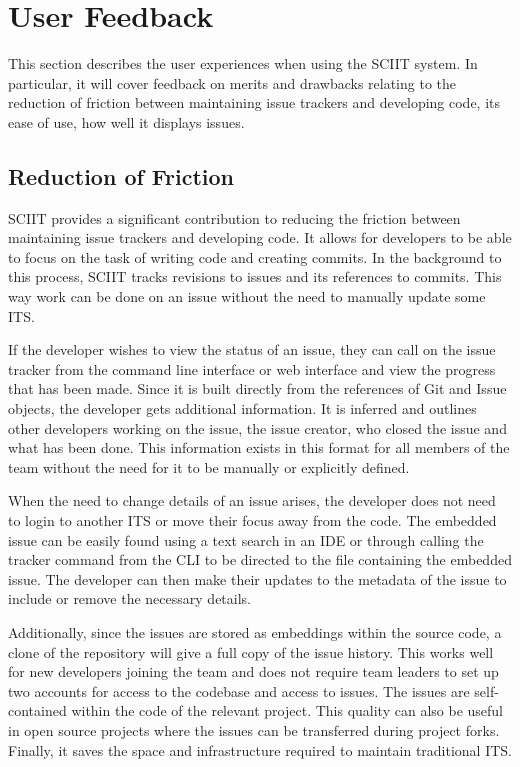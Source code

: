 \documentclass{mproj}
\begin{document}
\section{User Feedback}

This section describes the user experiences when using the SCIIT system. In particular, it will cover feedback on merits and drawbacks relating to the reduction of friction between maintaining issue trackers and developing code, its ease of use, how well it displays issues.


\subsection{Reduction of Friction}


SCIIT provides a significant contribution to reducing the friction between maintaining issue trackers and developing code. It allows for developers to be able to focus on the task of writing code and creating commits. In the background to this process, SCIIT tracks revisions to issues and its references to commits. This way work can be done on an issue without the need to manually update some ITS.

If the developer wishes to view the status of an issue, they can call on the issue tracker from the command line interface or web interface and view the progress that has been made. Since it is built directly from the references of Git and Issue objects, the developer gets additional information. It is inferred and outlines other developers working on the issue, the issue creator, who closed the issue and what has been done. This information exists in this format for all members of the team without the need for it to be manually or explicitly defined.

When the need to change details of an issue arises, the developer does not need to login to another ITS or move their focus away from the code. The embedded issue can be easily found using a text search in an IDE or through calling the tracker command from the CLI to be directed to the file containing the embedded issue. The developer can then make their updates to the metadata of the issue to include or remove the necessary details.

Additionally, since the issues are stored as embeddings within the source code, a clone of the repository will give a full copy of the issue history. This works well for new developers joining the team and does not require team leaders to set up two accounts for access to the codebase and access to issues. The issues are self-contained within the code of the relevant project. This quality can also be useful in open source projects where the issues can be transferred during project forks. Finally, it saves the space and infrastructure required to maintain traditional ITS.
\end{document}
